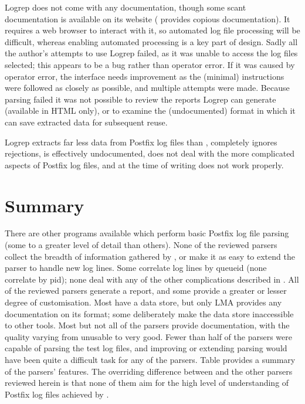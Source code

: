 Logrep does not come with any documentation, though some scant
documentation is available on its website (\parsername{} provides copious
documentation).  It requires a web browser to interact with it, so
automated log file processing will be difficult, whereas enabling automated
processing is a key part of \parsernames{} design.  Sadly all the author's
attempts to use Logrep failed, as it was unable to access the log files
selected; this appears to be a bug rather than operator error.  If it was
caused by operator error, the interface needs improvement as the (minimal)
instructions were followed as closely as possible, and multiple attempts
were made.  Because parsing failed it was not possible to review the
reports Logrep can generate (available in HTML only), or to examine the
(undocumented) format in which it can save extracted data for subsequent
reuse.

Logrep extracts far less data from Postfix log files than \parsername{},
completely ignores rejections, is effectively undocumented, does not deal
with the more complicated aspects of Postfix log files, and at the time of
writing does not work properly.

\section{Summary}

There are other programs available which perform basic Postfix log file
parsing (some to a greater level of detail than others).   None of the
reviewed parsers collect the breadth of information gathered by
\parsername{}, or make it as easy to extend the parser to handle new log
lines.  Some correlate log lines by queueid (none correlate by pid); none
deal with any of the other complications described in
.  All of the reviewed parsers generate a report,
and some provide a greater or lesser degree of customisation.  Most have a
data store, but only \gls{LMA} provides any documentation on its format;
some deliberately make the data store inaccessible to other tools.  Most
but not all of the parsers provide documentation, with the quality varying
from unusable to very good.  Fewer than half of the parsers were capable of
parsing the \numberOFlogFILES{} test log files, and improving or extending
parsing would have been quite a difficult task for any of the parsers.
Table  provides a summary of the
parsers' features.  The overriding difference between \parsername{} and the
other parsers reviewed herein is that none of them aim for the high level
of understanding of Postfix log files achieved by \parsername{}.


